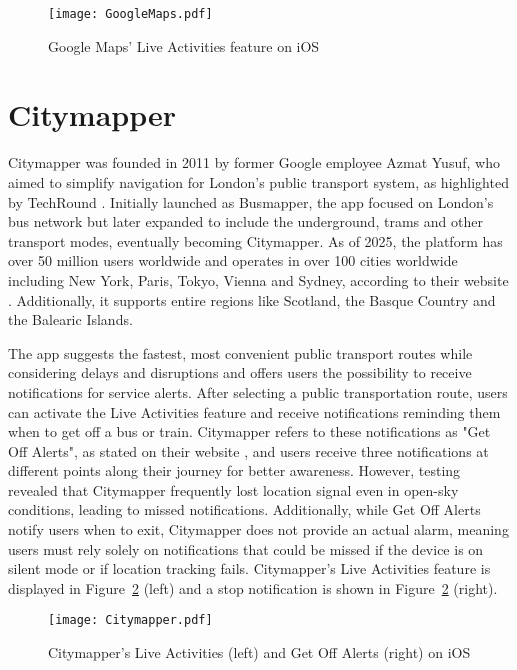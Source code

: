 \begin{figure}[htbp]
    \centering
    \texttt{[image: GoogleMaps.pdf]}
    \caption{Google Maps' Live Activities feature on iOS}
    \label{fig:GoogleMaps}
\end{figure}

\section{Citymapper}
Citymapper was founded in 2011 by former Google employee Azmat Yusuf, who aimed to simplify navigation for London's public transport system, as highlighted by TechRound \cite{citymapper_profile}.
Initially launched as Busmapper, the app focused on London's bus network but later expanded to include the underground, trams and other transport modes, eventually becoming Citymapper.
As of 2025, the platform has over 50 million users worldwide and operates in over 100 cities worldwide including New York, Paris, Tokyo, Vienna and Sydney, according to their website \cite{citymapper_cities}.
Additionally, it supports entire regions like Scotland, the Basque Country and the Balearic Islands.

The app suggests the fastest, most convenient public transport routes while considering delays and disruptions and offers users the possibility to receive notifications for service alerts.
After selecting a public transportation route, users can activate the Live Activities feature and receive notifications reminding them when to get off a bus or train.
Citymapper refers to these notifications as "Get Off Alerts", as stated on their website \cite{citymapper_getoffalerts}, and users receive three notifications at different points along their journey for better awareness.
However, testing revealed that Citymapper frequently lost location signal even in open-sky conditions, leading to missed notifications.
Additionally, while Get Off Alerts notify users when to exit, Citymapper does not provide an actual alarm, meaning users must rely solely on notifications that could be missed if the device is on silent mode or if location tracking fails.
Citymapper's Live Activities feature is displayed in Figure~\ref{fig:Citymapper} (left) and a stop notification is shown in Figure~\ref{fig:Citymapper} (right).

\begin{figure}[htbp]
    \centering
    \texttt{[image: Citymapper.pdf]}
    \caption{Citymapper's Live Activities (left) and Get Off Alerts (right) on iOS}
    \label{fig:Citymapper}
\end{figure}

